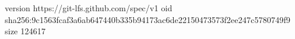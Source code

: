 version https://git-lfs.github.com/spec/v1
oid sha256:9c1563fcaf3a6ab647440b335b94173ac6de22150473573f2ee247c5780749f9
size 124617
